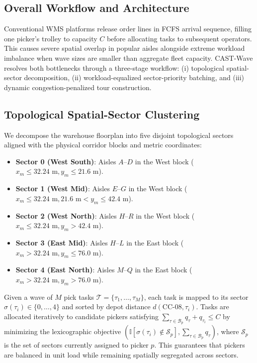 \documentclass[conference]{IEEEtran}
\begin{document}
\subsection{Overall Workflow and Architecture}
\label{sec:cast_overview}
Conventional WMS platforms release order lines in FCFS arrival sequence, filling one picker's trolley to capacity $C$ before allocating tasks to subsequent operators. This causes severe spatial overlap in popular aisles alongside extreme workload imbalance when wave sizes are smaller than aggregate fleet capacity. CAST-Wave resolves both bottlenecks through a three-stage workflow: (i) topological spatial-sector decomposition, (ii) workload-equalized sector-priority batching, and (iii) dynamic congestion-penalized tour construction.

\subsection{Topological Spatial-Sector Clustering}
\label{sec:spatial_clustering}
We decompose the warehouse floorplan into five disjoint topological sectors aligned with the physical corridor blocks and metric coordinates:
\begin{itemize}
    \item \textbf{Sector 0 (West South)}: Aisles $A$--$D$ in the West block ($x_m \le 32.24\text{ m}, y_m \le 21.6\text{ m}$).
    \item \textbf{Sector 1 (West Mid)}: Aisles $E$--$G$ in the West block ($x_m \le 32.24\text{ m}, 21.6\text{ m} < y_m \le 42.4\text{ m}$).
    \item \textbf{Sector 2 (West North)}: Aisles $H$--$R$ in the West block ($x_m \le 32.24\text{ m}, y_m > 42.4\text{ m}$).
    \item \textbf{Sector 3 (East Mid)}: Aisles $H$--$L$ in the East block ($x_m > 32.24\text{ m}, y_m \le 76.0\text{ m}$).
    \item \textbf{Sector 4 (East North)}: Aisles $M$--$Q$ in the East block ($x_m > 32.24\text{ m}, y_m > 76.0\text{ m}$).
\end{itemize}

Given a wave of $M$ pick tasks $\mathcal{T} = \{\tau_1, \dots, \tau_M\}$, each task is mapped to its sector $\sigma(\tau_i) \in \{0, \dots, 4\}$ and sorted by depot distance $d(\text{CC-08}, \tau_i)$. Tasks are allocated iteratively to candidate pickers satisfying $\sum_{\tau \in \mathcal{B}_p} q_\tau + q_{\tau_i} \le C$ by minimizing the lexicographic objective $(\mathbb{I}[\sigma(\tau_i) \notin \mathcal{S}_p], \sum_{\tau \in \mathcal{B}_p} q_\tau)$, where $\mathcal{S}_p$ is the set of sectors currently assigned to picker $p$. This guarantees that pickers are balanced in unit load while remaining spatially segregated across sectors.
\end{document}
